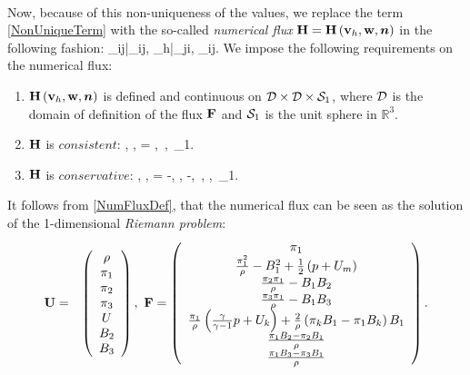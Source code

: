 \paragraph{}
Now, because of this non-uniqueness of the values, we replace the term \ref{NonUniqueTerm} with the so-called \textit{numerical flux} $\mathrm{\mathbf{H}} = \mathrm{\mathbf{H}}\left(\mathrm{\mathbf{v}}_h, \mathrm{\mathbf{w}}, \mbox{\boldmath $n$}\right)$ in the following fashion:
\be
\label{NumFluxDef}
\lo\mrF{}\ro \cdot \bfn_{ij}\ro \mrvh \approx \mrH{}|_{ij}, {\mrPsi_h}|_{ji}, \bfn_{ij}\ro \mrvh.
\ee
We impose the following requirements on the numerical flux:
\begin{enumerate}
	\item $\mathrm{\mathbf{H}}\left( \mathrm{\mathbf{v}}_h, \mathrm{\mathbf{w}}, \mbox{\boldmath $n$}\right)$ is defined and continuous on $\mathcal{D} \times \mathcal{D} \times \mathcal{S}_1$, where $\mathcal{D}$ is the domain of definition of the flux $\mathrm{\mathbf{F}}$ and $\mathcal{S}_1$ is the unit sphere in $\mathbb{R}^3$.
	\item $\mathrm{\mathbf{H}}$ is $consistent$:
		\be
			\label{FluxConsistent} \mrH\lo \mrvh, \mrvh, \bfn\ro = \mrF\lo \mrvh\ro \bfn,\ \mrvh\in{},\ \bfn\in{}_1.
		\ee
	\item $\mathrm{\mathbf{H}}$ is $conservative$:
		\be
			\label{FluxConservative} \mrH\lo \mrvh, \mrw, \bfn\ro = -\mrH\lo \mrw, \mrvh, -\bfn\ro,\ \mrvh, \mrw\in{},\ \bfn\in{}_1.
		\ee
 \end{enumerate}
It follows from \ref{NumFluxDef}, that the numerical flux can be seen as the solution of the 1-dimensional \textit{Riemann problem}:
\begin{eqnarray}
\mathrm{\mathbf{U}} & = & \left(\begin{array}{c}\rho \\ \pi_1 \\ \pi_2 \\ \pi_3 \\ U \\ B_2 \\ B_3 \\ \end{array}\right),\ \mathrm{\mathbf{F}} = \left(\begin{array}{c} \pi_1 \\ \frac{\pi_1^2}{\rho} - B_1^2 + \frac12\left( p + U_m\right) \\ \frac{\pi_2 \pi_1}{\rho} - B_1 B_2 \\ \frac{\pi_3 \pi_1}{\rho} - B_1 B_3\\ \frac{\pi_1}{\rho} \left( \frac{\gamma}{\gamma - 1} p + U_k\right) + \frac{2}{\rho} \left( \pi_k B_1 - \pi_1 B_k\right) B_1  \\ \frac{\pi_1 B_2 - \pi_2 B_1}{\rho} \\ \frac{\pi_1 B_3 - \pi_3 B_1}{\rho} \\ \end{array}\right).
\end{eqnarray}

